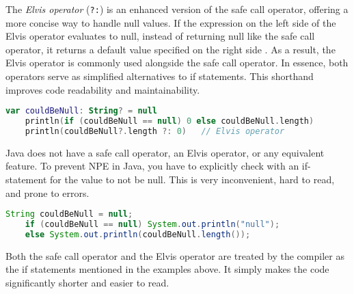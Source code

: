 \documentclass[a4paper, 11pt]{article}
\begin{document}
  The \textit{Elvis operator} (\texttt{?:}) is an enhanced version of the safe call operator, offering a more concise way to handle null values. If the expression on the left side of the Elvis operator evaluates to null, instead of returning null like the safe call operator, it returns a default value specified on the right side \cite{nullsafety-elvis}. As a result, the Elvis operator is commonly used alongside the safe call operator. In essence, both operators serve as simplified alternatives to if statements. This shorthand improves code readability and maintainability. %
  \begin{lstlisting}[language=Kotlin,title={Using the Elvis operator in comparison to an if statement}]
    var couldBeNull: String? = null
    println(if (couldBeNull == null) 0 else couldBeNull.length)
    println(couldBeNull?.length ?: 0)   // Elvis operator
  \end{lstlisting}
  \hfill \break
  Java does not have a safe call operator, an Elvis operator, or any equivalent feature. To prevent NPE in Java, you have to explicitly check with an if-statement for the value to not be null. This is very inconvenient, hard to read, and prone to errors.
  \begin{lstlisting}[language=Java,title={Prevent NPE in Java}]
    String couldBeNull = null;
    if (couldBeNull == null) System.out.println("null");
    else System.out.println(couldBeNull.length());
  \end{lstlisting}
  \hfill \break
  Both the safe call operator and the Elvis operator are treated by the compiler as the if statements mentioned in the examples above. It simply makes the code significantly shorter and easier to read.
\end{document}
